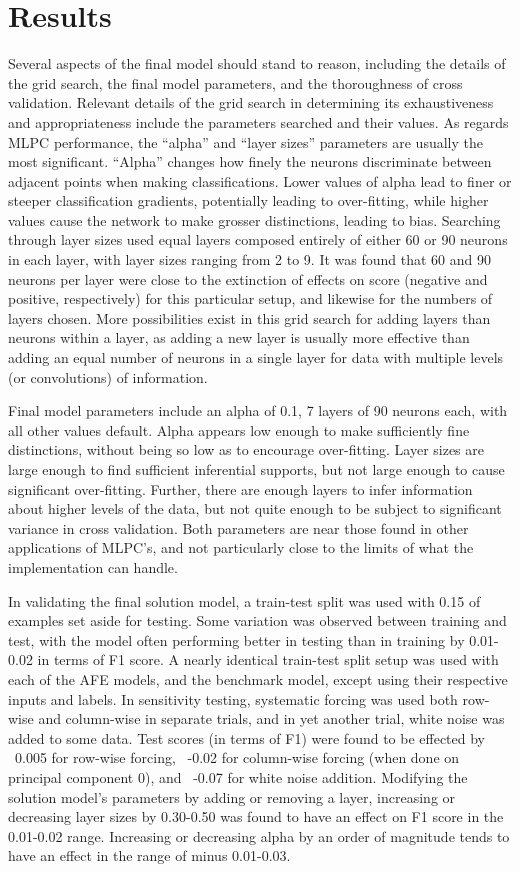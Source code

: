 \documentclass[conference]{IEEEtran}
\begin{document}
\section{Results}
Several aspects of the final model should stand to reason, including the details of the grid search, the final model parameters, and the thoroughness of cross validation. Relevant details of the grid search in determining its exhaustiveness and appropriateness include the parameters searched and their values. As regards MLPC performance, the “alpha” and “layer sizes” parameters are usually the most significant. “Alpha” changes how finely the neurons discriminate between adjacent points when making classifications. Lower values of alpha lead to finer or steeper classification gradients, potentially leading to over-fitting, while higher values cause the network to make grosser distinctions, leading to bias. Searching through layer sizes used equal layers composed entirely of either 60 or 90 neurons in each layer, with layer sizes ranging from 2 to 9. It was found that 60 and 90 neurons per layer were close to the extinction of effects on score (negative and positive, respectively) for this particular setup, and likewise for the numbers of layers chosen. More possibilities exist in this grid search for adding layers than neurons within a layer, as adding a new layer is usually more effective than adding an equal number of neurons in a single layer for data with multiple levels (or convolutions) of information.

Final model parameters include an alpha of 0.1, 7 layers of 90 neurons each, with all other values default. Alpha appears low enough to make sufficiently fine distinctions, without being so low as to encourage over-fitting. Layer sizes are large enough to find sufficient inferential supports, but not large enough to cause significant over-fitting. Further, there are enough layers to infer information about higher levels of the data, but not quite enough to be subject to significant variance in cross validation. Both parameters are near those found in other applications of MLPC's, and not particularly close to the limits of what the implementation can handle.

In validating the final solution model, a train-test split was used with 0.15 of examples set aside for testing. Some variation was observed between training and test, with the model often performing better in testing than in training by 0.01-0.02 in terms of F1 score. A nearly identical train-test split setup was used with each of the AFE models, and the benchmark model, except using their respective inputs and labels. In sensitivity testing, systematic forcing was used both row-wise and column-wise in separate trials, and in yet another trial, white noise was added to some data. Test scores (in terms of F1) were found to be effected by ~0.005 for row-wise forcing, ~-0.02 for column-wise forcing (when done on principal component 0), and ~-0.07 for white noise addition. Modifying the solution model's parameters by adding or removing a layer, increasing or decreasing layer sizes by 0.30-0.50 was found to have an effect on F1 score in the 0.01-0.02 range. Increasing or decreasing alpha by an order of magnitude tends to have an effect in the range of minus 0.01-0.03.
\end{document}
